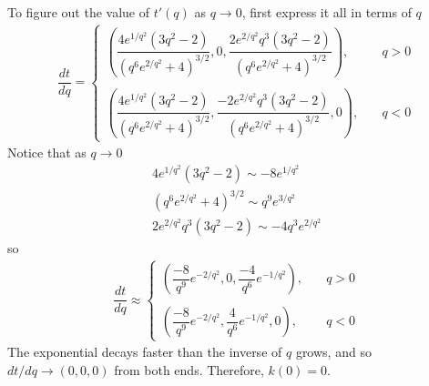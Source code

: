 \documentclass{article}
\begin{document}
	To figure out the value of $t'(q)$ as $q \to 0$, first express it all in terms of $q$
	\begin{gather*}
		\dfrac{dt}{dq} = \begin{cases}
			\left( \dfrac{ 4 e^{1/q^2} (3q^2 - 2) }{ ( q^6 e^{2/q^2} + 4 )^{3/2} }, 0, \dfrac{ 2 e^{2/q^2} q^3(3q^2 - 2) }{ ( q^6 e^{2/q^2} + 4 )^{3/2} } \right), \quad &q > 0
			\\ \\
			\left( \dfrac{ 4 e^{1/q^2} (3q^2 - 2) }{ ( q^6 e^{2/q^2} + 4 )^{3/2} }, \dfrac{ -2 e^{2/q^2} q^3(3q^2 - 2) }{ ( q^6 e^{2/q^2} + 4 )^{3/2} }, 0 \right), \quad &q < 0
		\end{cases}
	\end{gather*}
	Notice that as $q \to 0$
	\begin{gather*}
		4 e^{1/q^2} (3q^2 - 2) \sim - 8 e^{1/q^2} \\
		( q^6 e^{2/q^2} + 4 )^{3/2} \sim q^9 e^{3/q^2} \\
		2e^{2/q^2} q^3(3q^2 - 2) \sim - 4 q^3 e^{2/q^2}
	\end{gather*}
	so
	\begin{gather*}
		\dfrac{dt}{dq} \approx \begin{cases}
			\left( \dfrac{ -8 }{ q^9 } e^{-2/q^2}, 0, \dfrac{ -4 }{ q^6 } e^{-1/q^2} \right), \quad &q > 0
			\\ \\
			\left( \dfrac{ -8 }{ q^9 } e^{-2/q^2}, \dfrac{ 4 }{ q^6 } e^{-1/q^2}, 0 \right), \quad &q < 0
		\end{cases}
	\end{gather*}
	The exponential decays faster than the inverse of $q$ grows, and so $dt/dq \to (0, 0, 0)$ from both ends. Therefore, $k(0) = 0$.
	
\end{document}
